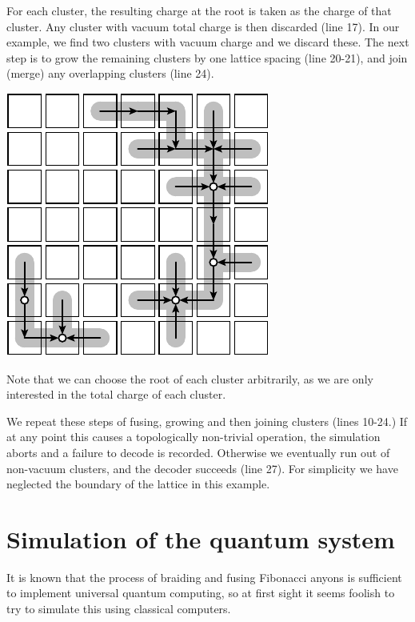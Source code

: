 For each cluster, the resulting charge at the root is taken as the charge of
that cluster. Any cluster with vacuum total charge is then discarded (line 17).
In our example, we find two clusters with vacuum charge and we discard these.
The next step is to grow the remaining clusters by one lattice spacing (line 20-21),
and join (merge) any overlapping clusters (line 24).
\begin{center}
\includegraphics[]{pic-decode-3.pdf}
\end{center}

Note that we can choose the root of each cluster arbitrarily,
as we are only interested in the total charge of each cluster.

We repeat these steps of fusing, growing and then joining clusters (lines 10-24.)
If at any point this causes a topologically 
non-trivial operation, the simulation aborts and a failure
to decode is recorded.
Otherwise we eventually run out
of non-vacuum clusters, and the decoder succeeds (line 27).
For simplicity we have neglected the boundary of the lattice in
this example.


%
%

\section{Simulation of the quantum system}

It is known that the process of braiding and fusing
Fibonacci anyons is sufficient to implement universal quantum
computing, so at first sight it seems foolish to try to simulate
this using classical computers. %

